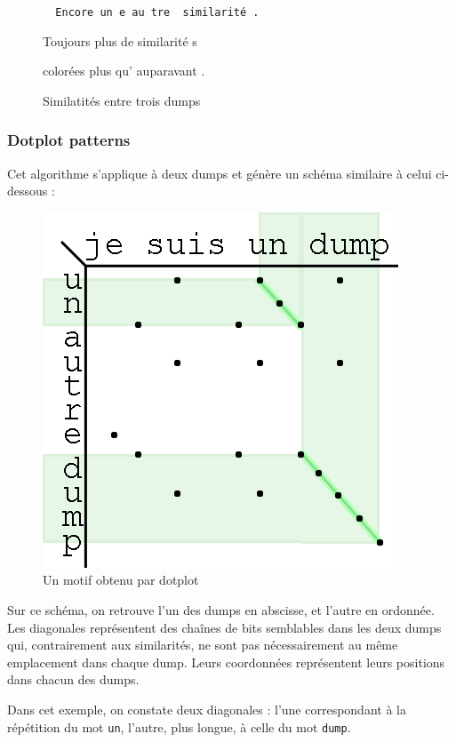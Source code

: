 \begin{figure}[!h]
  \begin{center}
  {\tt
  {\color{dissimColor} Encore un}{\color{otherSimColor} e au}{\color{dissimColor} tre }{\color{simColor} similarité}{\color{dissimColor} .}

  {\color{dissimColor} Toujours }{\color{simColor} plus }{\color{dissimColor} de }{\color{simColor} similarité}{\color{dissimColor} s}

  {\color{dissimColor} colorées }{\color{simColor} plus }{\color{dissimColor} qu'}{\color{otherSimColor} auparavant}{\color{dissimColor} .}
  }
  \end{center}
  \caption{Similatités entre trois dumps}
  \label{04-1-sim_mult}
\end{figure}

\subsubsection{Dotplot patterns \cite {ref-dotplot}} \label{04-dotplot}

Cet algorithme s'applique à deux dumps et génère un schéma similaire à celui ci-dessous :

\begin{figure}[!h]
  \begin{center}
  \includegraphics[scale=1]{res/04-2-dotplot.png}
  \caption{Un motif obtenu par dotplot}
  \label{04-1-dotplot}
  \end{center}
\end{figure}

Sur ce schéma, on retrouve l'un des dumps en abscisse, et l'autre en ordonnée. Les diagonales représentent des chaînes de bits semblables dans les deux dumps qui, contrairement aux similarités, ne sont pas nécessairement au même emplacement dans chaque dump. Leurs coordonnées représentent leurs positions dans chacun des dumps.

Dans cet exemple, on constate deux diagonales : l'une correspondant à la répétition du mot \texttt{un}, l'autre, plus longue, à celle du mot \texttt{dump}.
